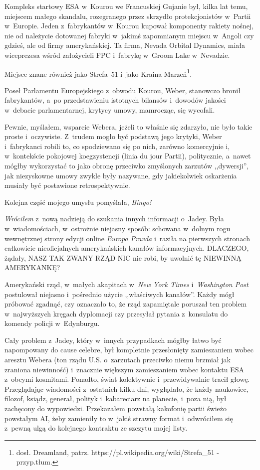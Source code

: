 \documentclass[oneside,polish,12pt,sfheadings]{mwbk}
\begin{document}
Kompleks startowy ESA w~Kourou we Francuskiej Gujanie był, kilka lat
temu, miejscem małego skandalu, rozegranego przez skrzydło
protekcjonistów w~Partii w~Europie. Jeden z~fabrykantów w~Kourou kupował
komponenty rakiety nośnej, nie od należycie dotowanej fabryki w~jakimś
zapomnianym miejscu w~Angoli czy gdzieś, ale od firmy amerykańskiej. Ta
firma, Nevada Orbital Dynamics, miała wiceprezesa wśród założycieli  FPC i~fabrykę w~Groom Lake w~Nevadzie.

Miejsce znane również jako Strefa~51 i~jako Kraina
Marzeń\footnote{dosł. Dreamland, patrz.
https://pl.wikipedia.org/wiki/Strefa\_51 - przyp.tłum.}.

Poseł Parlamentu Europejskiego z~obwodu Kourou, Weber, stanowczo bronił
fabrykantów, a~po przedstawieniu istotnych bilansów i~dowodów jakości w~debacie parlamentarnej, krytycy umowy, mamrocząc, się wycofali.

Pewnie, myślałem, wsparcie Webera, jeżeli to właśnie się zdarzyło, nie
było takie proste i~oczywiste. Z~trudem mogło być podstawą jego krytyki,
Weber i~fabrykanci robili to, co spodziewano się po nich, zarówno
komercyjnie i, w~kontekście pokojowej koegzystencji (linia du jour
Partii), politycznie, a~nawet mógłby wykorzystać to jako obronę
przeciwko zmyślonych zarzutów ,,dywersji'', jak niezyskowne umowy zwykle
były nazywane, gdy jakiekolwiek oskarżenia musiały być postawione
retrospektywnie.

Kolejna część mojego umysłu pomyślała, \emph{Bingo!}

\emph{Wróciłem} z~nową nadzieją do szukania innych informacji o~Jadey.
Była w~wiadomościach, w~ostrożnie niejasny sposób: schowana w~dolnym
rogu wewnętrznej strony edycji online \emph{Europa Pravda} i~raziła na
pierwszych stronach całkowicie nieoficjalnych amerykańskich kanałów
informacyjnych. DLACZEGO, żądały, NASZ TAK ZWANY RZĄD NIC nie robi, by
uwolnić tę NIEWINNĄ AMERYKANKĘ?

Amerykański rząd, w~małych akapitach w~\emph{New York Times} i~\emph{Washington Post} postulował niejasno i~pośrednio użycie
,,właściwych kanałów''. Każdy mógł próbować zgadnąć, czy oznaczało to, że
rząd zapamiętale poruszał ten problem w~najwyższych kręgach dyplomacji
czy przesyłał pytania z~konsulatu do komendy policji w~Edynburgu.

Cały problem z~Jadey, który w~innych przypadkach mógłby łatwo być
napompowany do cause celebre, był kompletnie przesłonięty zamieszaniem
wobec aresztu Webera (ton rządu U.S. o~zarzutach przeciwko niemu brzmiał
jak zraniona niewinność) i~znacznie większym zamieszaniem wobec kontaktu
ESA z~obcymi kosmitami. Ponadto, świat kolektywnie i~przewidywalnie
tracił głowę. Przeglądając wiadomości z~ostatnich kilku dni, wyglądało,
że każdy naukowiec, filozof, ksiądz, generał, polityk i~kabareciarz na
planecie, i~poza nią, był zachęcony do wypowiedzi. Przekazałem powstałą
kakofonię partii świeżo powstałym AI, żeby zamieniły to w~jakiś strawny
format i~odwróciłem się z~pewną ulgą do kolejnego kontraktu ze szczytu
mojej listy.
\end{document}
